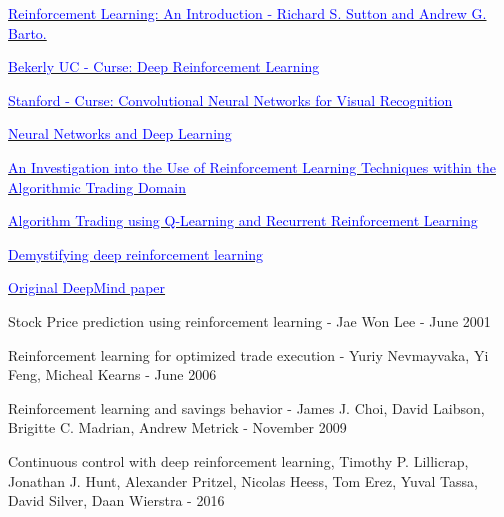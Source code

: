 
\begin{thebibliography}{9}
	 \href{http://people.inf.elte.hu/lorincz/Files/RL_2006/SuttonBook.pdf}{\textcolor{blue}{Reinforcement Learning: An Introduction - Richard S. Sutton and Andrew G. Barto.}}
	
	 \href{http://rll.berkeley.edu/deeprlcourse/}{\textcolor{blue}{Bekerly UC - Curse: Deep Reinforcement Learning}}
	
	 \href{http://karpathy.github.io/2016/05/31/rl/}{\textcolor{blue}{Stanford - Curse: Convolutional Neural Networks for Visual Recognition}}
	
	 \href{http://neuralnetworksanddeeplearning.com/}{\textcolor{blue}{Neural Networks and Deep Learning}}
	
	 \href{http://www.doc.ic.ac.uk/teaching/distinguished-projects/2015/j.cumming.pdf}{\textcolor{blue}{An Investigation into the Use of Reinforcement Learning Techniques within the Algorithmic Trading Domain}}
	
	 \href{http://cs229.stanford.edu/proj2009/LvDuZhai.pdf}{\textcolor{blue}{Algorithm Trading using Q-Learning and Recurrent Reinforcement Learning}}
	
	 \href{http://neuro.cs.ut.ee/demystifying-deep-reinforcement-learning/}{\textcolor{blue}{Demystifying deep reinforcement learning}}
	
	 \href{https://arxiv.org/pdf/1312.5602v1.pdf}{\textcolor{blue}{Original DeepMind paper}}
	
	 Stock Price prediction using  reinforcement learning - Jae Won Lee - June 2001
	
	Reinforcement learning for optimized trade execution - Yuriy Nevmayvaka, Yi Feng, Micheal Kearns - June 2006
	
	 Reinforcement learning and savings behavior - James J. Choi, David Laibson, Brigitte C. Madrian, Andrew Metrick - November 2009
	
	 Continuous control with deep reinforcement learning, Timothy P. Lillicrap, Jonathan J. Hunt, Alexander Pritzel, Nicolas Heess, Tom Erez, Yuval Tassa, David Silver, Daan Wierstra - 2016
\end{thebibliography}